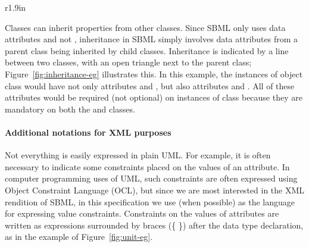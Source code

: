 \begin{wrapfigure}[10]{r}{1.9in}
  \centering
  \small
  \vspace*{-7ex}
  \caption{Inheritance.}
  \label{fig:inheritance-eg}
\end{wrapfigure}
Classes can inherit properties from other classes.  Since SBML
only uses data attributes and not , inheritance in SBML
simply involves data attributes from a parent class being
inherited by child classes.  Inheritance is indicated by a line
between two classes, with an open triangle next to the parent
class; Figure~\ref{fig:inheritance-eg} illustrates this.  In this
example, the instances of object class  would have
not only attributes  and , but also attributes
 and .  All of these attributes would be
required (not optional) on instances of class 
because they are mandatory on both the  and
 classes.



\paragraph{Additional notations for XML purposes}

Not everything is easily expressed in plain UML.  For example, it
is often necessary to indicate some constraints placed on the
values of an attribute.  In computer programming uses of UML, such
constraints are often expressed using Object Constraint Language
(OCL), but since we are most interested in the XML rendition of
SBML, in this specification we use \xmlschemaone (when possible)
as the language for expressing value constraints.  Constraints on
the values of attributes are written as expressions surrounded by
braces (\{ \}) after the data type declaration, as in the example
of Figure~\ref{fig:unit-eg}.

